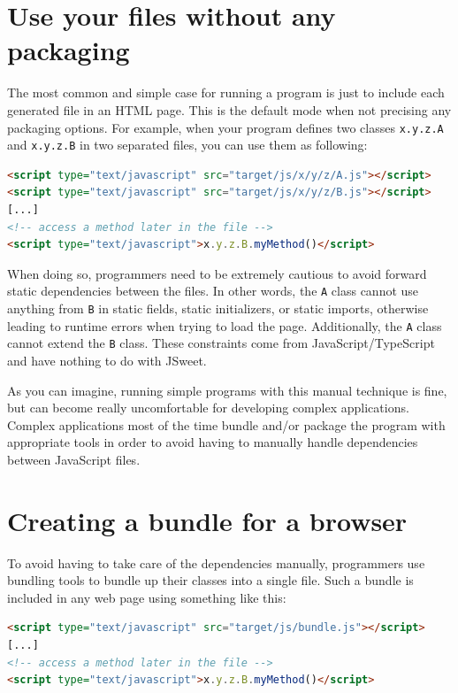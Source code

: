 \documentclass[a4paper]{report}
\begin{document}
\section{Use your files without any packaging}

The most common and simple case for running a program is just to include each generated file in an HTML page. This is the default mode when not precising any packaging options. For example, when your program defines two classes \texttt{x.y.z.A} and \texttt{x.y.z.B} in two separated files, you can use them as following:

\begin{lstlisting}[language=html]
<script type="text/javascript" src="target/js/x/y/z/A.js"></script>
<script type="text/javascript" src="target/js/x/y/z/B.js"></script>
[...]
<!-- access a method later in the file -->
<script type="text/javascript">x.y.z.B.myMethod()</script>
\end{lstlisting}

When doing so, programmers need to be extremely cautious to avoid forward static dependencies between the files. In other words, the \texttt{A} class cannot use anything from \texttt{B} in static fields, static initializers, or static imports, otherwise leading to runtime errors when trying to load the page. Additionally,  the \texttt{A} class cannot extend the \texttt{B} class. These constraints come from JavaScript/TypeScript and have nothing to do with JSweet.

As you can imagine, running simple programs with this manual technique is fine, but can become really uncomfortable for developing complex applications. Complex applications most of the time bundle and/or package the program with appropriate tools in order to avoid having to manually handle dependencies between JavaScript files.

\section{Creating a bundle for a browser}

To avoid having to take care of the dependencies manually, programmers use bundling tools to bundle up their classes into a single file. Such a bundle is included in any web page using something like this:

\begin{lstlisting}[language=html]
<script type="text/javascript" src="target/js/bundle.js"></script>
[...]
<!-- access a method later in the file -->
<script type="text/javascript">x.y.z.B.myMethod()</script>
\end{lstlisting}
\end{document}
